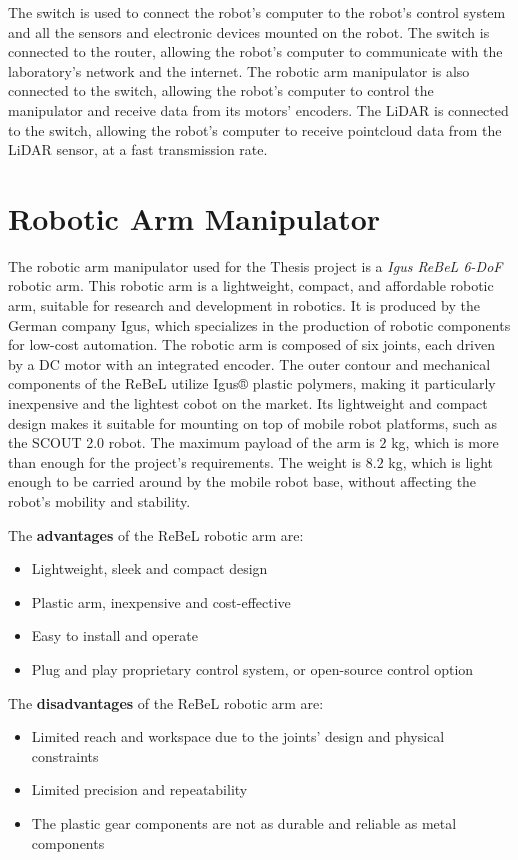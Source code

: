 The switch is used to connect the robot's computer to the robot's control system and all the sensors
and electronic devices mounted on the robot. The switch is connected to the router, allowing the robot's computer
to communicate with the laboratory's network and the internet. The robotic arm manipulator is also connected to the switch,
allowing the robot's computer to control the manipulator and receive data from its motors' encoders. 
The LiDAR is connected to the switch, allowing the robot's computer to receive pointcloud data from the LiDAR sensor,
at a fast transmission rate.
 
\section{Robotic Arm Manipulator}

The robotic arm manipulator used for the Thesis project is a \textit{Igus ReBeL 6-DoF} robotic arm.
This robotic arm is a lightweight, compact, and affordable robotic arm, suitable for research and development
in robotics. It is produced by the German company Igus, which specializes in the production of robotic components
for low-cost automation. The robotic arm is composed of six joints, each driven by a DC motor with an integrated encoder.
The outer contour and mechanical components of the ReBeL utilize Igus® plastic polymers, making it particularly inexpensive
and the lightest cobot on the market. Its lightweight and compact design makes it suitable for mounting on top
of mobile robot platforms, such as the SCOUT 2.0 robot. The maximum payload of the arm is $2$ kg, which is more than enough
for the project's requirements. The weight is $8.2$ kg, which is light enough to be carried around by the mobile robot base,
without affecting the robot's mobility and stability.

The \textbf{advantages} of the ReBeL robotic arm are:

\begin{itemize}
    \item Lightweight, sleek and compact design
    \item Plastic arm, inexpensive and cost-effective
    \item Easy to install and operate
    \item Plug and play proprietary control system, or open-source control option
\end{itemize}

The \textbf{disadvantages} of the ReBeL robotic arm are:
\begin{itemize}
    \item Limited reach and workspace due to the joints' design and physical constraints
    \item Limited precision and repeatability
    \item The plastic gear components are not as durable and reliable as metal components
\end{itemize}

